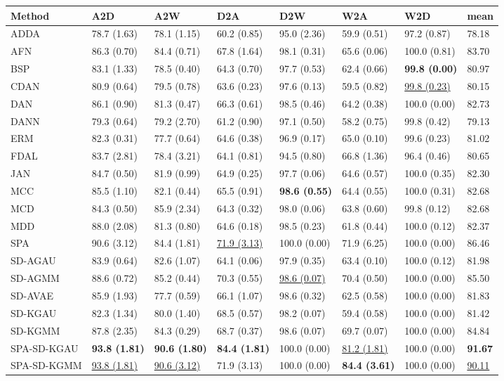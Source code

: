 \begin{tabular}{llllllll}
\toprule
Method & A2D & A2W & D2A & D2W & W2A & W2D & mean \\
\midrule
ADDA & 78.7 (1.63) & 78.1 (1.15) & 60.2 (0.85) & 95.0 (2.36) & 59.9 (0.51) & 97.2 (0.87) & 78.18 \\
AFN & 86.3 (0.70) & 84.4 (0.71) & 67.8 (1.64) & 98.1 (0.31) & 65.6 (0.06) & 100.0 (0.81) & 83.70 \\
BSP & 83.1 (1.33) & 78.5 (0.40) & 64.3 (0.70) & 97.7 (0.53) & 62.4 (0.66) & \textbf{99.8 (0.00)} & 80.97 \\
CDAN & 80.9 (0.64) & 79.5 (0.78) & 63.6 (0.23) & 97.6 (0.13) & 59.5 (0.82) & \underline{99.8 (0.23)} & 80.15 \\
DAN & 86.1 (0.90) & 81.3 (0.47) & 66.3 (0.61) & 98.5 (0.46) & 64.2 (0.38) & 100.0 (0.00) & 82.73 \\
DANN & 79.3 (0.64) & 79.2 (2.70) & 61.2 (0.90) & 97.1 (0.50) & 58.2 (0.75) & 99.8 (0.42) & 79.13 \\
ERM & 82.3 (0.31) & 77.7 (0.64) & 64.6 (0.38) & 96.9 (0.17) & 65.0 (0.10) & 99.6 (0.23) & 81.02 \\
FDAL & 83.7 (2.81) & 78.4 (3.21) & 64.1 (0.81) & 94.5 (0.80) & 66.8 (1.36) & 96.4 (0.46) & 80.65 \\
JAN & 84.7 (0.50) & 81.9 (0.99) & 64.9 (0.25) & 97.7 (0.06) & 64.6 (0.57) & 100.0 (0.35) & 82.30 \\
MCC & 85.5 (1.10) & 82.1 (0.44) & 65.5 (0.91) & \textbf{98.6 (0.55)} & 64.4 (0.55) & 100.0 (0.31) & 82.68 \\
MCD & 84.3 (0.50) & 85.9 (2.34) & 64.3 (0.32) & 98.0 (0.06) & 63.8 (0.60) & 99.8 (0.12) & 82.68 \\
MDD & 88.0 (2.08) & 81.3 (0.80) & 64.6 (0.18) & 98.5 (0.23) & 61.8 (0.44) & 100.0 (0.12) & 82.37 \\
SPA  & 90.6 (3.12) & 84.4 (1.81) & \underline{71.9 (3.13)} & 100.0 (0.00) & 71.9 (6.25) & 100.0 (0.00) & 86.46 \\
\midrule
SD-AGAU & 83.9 (0.64) & 82.6 (1.07) & 64.1 (0.06) & 97.9 (0.35) & 63.4 (0.10) & 100.0 (0.12) & 81.98 \\
SD-AGMM & 88.6 (0.72) & 85.2 (0.44) & 70.3 (0.55) & \underline{98.6 (0.07)} & 70.4 (0.50) & 100.0 (0.00) & 85.50 \\
SD-AVAE & 85.9 (1.93) & 77.7 (0.59) & 66.1 (1.07) & 98.6 (0.32) & 62.5 (0.58) & 100.0 (0.00) & 81.83 \\
SD-KGAU & 82.3 (1.34) & 80.0 (1.40) & 68.5 (0.57) & 98.2 (0.07) & 59.4 (0.58) & 100.0 (0.00) & 81.42 \\
SD-KGMM & 87.8 (2.35) & 84.3 (0.29) & 68.7 (0.37) & 98.6 (0.07) & 69.7 (0.07) & 100.0 (0.00) & 84.84 \\
SPA-SD-KGAU & \textbf{93.8 (1.81)} & \textbf{90.6 (1.80)} & \textbf{84.4 (1.81)} & 100.0 (0.00) & \underline{81.2 (1.81)} & 100.0 (0.00) & \textbf{91.67} \\
SPA-SD-KGMM & \underline{93.8 (1.81)} & \underline{90.6 (3.12)} & 71.9 (3.13) & 100.0 (0.00) & \textbf{84.4 (3.61)} & 100.0 (0.00) & \underline{90.11} \\
\bottomrule
\end{tabular}
